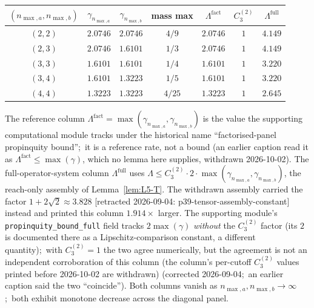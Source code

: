 \documentclass[11pt,a4paper]{article}
\theoremstyle{plain}
\theoremstyle{definition}
\newcommand{\nmaxa}{n_{\max,a}}
\newcommand{\nmaxb}{n_{\max,b}}
\begin{document}
\begin{center}
\begin{tabular}{ccccccc}
\toprule
$(\nmaxa, \nmaxb)$ & $\gamma_{\nmaxa}$ & $\gamma_{\nmaxb}$ &
mass max & $\Lambda^{\mathrm{fact}}$ &
$C_3^{(2)}$ & $\Lambda^{\mathrm{full}}$ \\
\midrule
$(2, 2)$ & $2.0746$ & $2.0746$ & $4/9$ & $2.0746$ & $1$ & $4.149$ \\
$(2, 3)$ & $2.0746$ & $1.6101$ & $1/3$ & $2.0746$ & $1$ & $4.149$ \\
$(3, 3)$ & $1.6101$ & $1.6101$ & $1/4$ & $1.6101$ & $1$ & $3.220$ \\
$(3, 4)$ & $1.6101$ & $1.3223$ & $1/5$ & $1.6101$ & $1$ & $3.220$ \\
$(4, 4)$ & $1.3223$ & $1.3223$ & $4/25$ & $1.3223$ & $1$ & $2.645$ \\
\bottomrule
\end{tabular}
\end{center}

The reference column $\Lambda^{\mathrm{fact}} = \max(\gamma_{\nmaxa},
\gamma_{\nmaxb})$ is the value the supporting computational module tracks
under the historical name ``factorised-panel propinquity bound'';\ it is a
reference rate, not a bound (an earlier caption read it as
$\Lambda^{\mathrm{fact}} \le \max(\gamma)$, which no lemma here supplies,
withdrawn 2026-10-02). The full-operator-system column
$\Lambda^{\mathrm{full}}$ uses
$\Lambda \le C_3^{(2)} \cdot 2 \cdot
\max(\gamma_{\nmaxa}, \gamma_{\nmaxb})$, the reach-only assembly of
Lemma~\ref{lem:L5-T}. The withdrawn assembly carried the factor
$1 + 2\sqrt{2} \approx 3.828$ [retracted 2026-09-04: p39-tensor-assembly-constant] instead and printed this
column $1.914\times$ larger. The supporting module's
\texttt{propinquity\_bound\_full} field tracks $2\max(\gamma)$
\emph{without} the $C_3^{(2)}$ factor (its $2$ is documented there as a
Lipschitz-comparison constant, a different quantity);\ with $C_3^{(2)} = 1$
the two agree numerically, but the agreement is not an independent
corroboration of this column (the column's per-cutoff $C_3^{(2)}$ values
printed before 2026-10-02 are withdrawn) (corrected 2026-09-04;\ an
earlier caption said the two ``coincide''). Both columns vanish as $\nmaxa, \nmaxb \to \infty$;\ both
exhibit monotone decrease across the diagonal panel.
\end{document}

